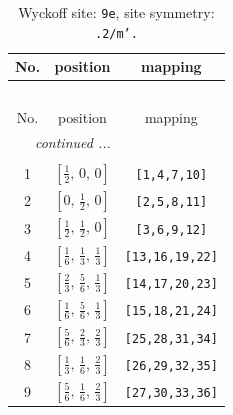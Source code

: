\documentclass[fleqn,8pt]{jsarticle}
\begin{document}
\begin{longtable}{ccc}
\caption{Wyckoff site: {\tt 9e}, site symmetry: {\tt .2/m'.}}
 \\
 \hline \hline
No. & position & mapping \\ \hline \endfirsthead

\multicolumn{2}{l}{\tablename\ \thetable{}} \\
 \hline \hline
No. & position & mapping \\ \hline \endhead

 \hline \hline
\multicolumn{2}{r}{\footnotesize\it continued ...} \\ \endfoot

 \hline \hline
\multicolumn{2}{r}{} \\ \endlastfoot

1 & $\left[ \frac{1}{2},\, 0,\, 0 \right]$ & {\tt [1,4,7,10]} \\ \hline
2 & $\left[ 0,\, \frac{1}{2},\, 0 \right]$ & {\tt [2,5,8,11]} \\ \hline
3 & $\left[ \frac{1}{2},\, \frac{1}{2},\, 0 \right]$ & {\tt [3,6,9,12]} \\ \hline
4 & $\left[ \frac{1}{6},\, \frac{1}{3},\, \frac{1}{3} \right]$ & {\tt [13,16,19,22]} \\ \hline
5 & $\left[ \frac{2}{3},\, \frac{5}{6},\, \frac{1}{3} \right]$ & {\tt [14,17,20,23]} \\ \hline
6 & $\left[ \frac{1}{6},\, \frac{5}{6},\, \frac{1}{3} \right]$ & {\tt [15,18,21,24]} \\ \hline
7 & $\left[ \frac{5}{6},\, \frac{2}{3},\, \frac{2}{3} \right]$ & {\tt [25,28,31,34]} \\ \hline
8 & $\left[ \frac{1}{3},\, \frac{1}{6},\, \frac{2}{3} \right]$ & {\tt [26,29,32,35]} \\ \hline
9 & $\left[ \frac{5}{6},\, \frac{1}{6},\, \frac{2}{3} \right]$ & {\tt [27,30,33,36]} \\
\end{longtable}
\renewcommand{\arraystretch}{1.2}
\end{document}
